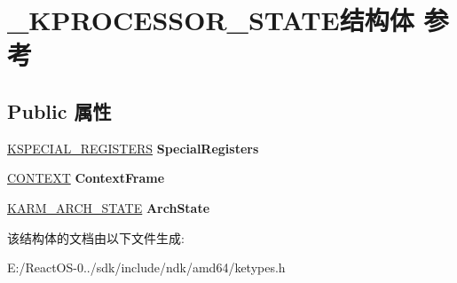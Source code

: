 \hypertarget{struct___k_p_r_o_c_e_s_s_o_r___s_t_a_t_e}{}\section{\+\_\+\+K\+P\+R\+O\+C\+E\+S\+S\+O\+R\+\_\+\+S\+T\+A\+T\+E结构体 参考}
\label{struct___k_p_r_o_c_e_s_s_o_r___s_t_a_t_e}
\subsection*{Public 属性}
\begin{DoxyCompactItemize}
\item 
\mbox{\label{struct___k_p_r_o_c_e_s_s_o_r___s_t_a_t_e_aa22101462caae96cbd41880b07e19c52}} 
\hyperlink{struct___k_s_p_e_c_i_a_l___r_e_g_i_s_t_e_r_s}{K\+S\+P\+E\+C\+I\+A\+L\+\_\+\+R\+E\+G\+I\+S\+T\+E\+RS} {\bfseries Special\+Registers}
\item 
\mbox{\label{struct___k_p_r_o_c_e_s_s_o_r___s_t_a_t_e_adbebe646e87e25ef95d4d05e7cfc8ec5}} 
\hyperlink{struct___c_o_n_t_e_x_t}{C\+O\+N\+T\+E\+XT} {\bfseries Context\+Frame}
\item 
\mbox{\label{struct___k_p_r_o_c_e_s_s_o_r___s_t_a_t_e_a940f27f434cb52c343289c0cf602c057}} 
\hyperlink{struct___k_a_r_m___a_r_c_h___s_t_a_t_e}{K\+A\+R\+M\+\_\+\+A\+R\+C\+H\+\_\+\+S\+T\+A\+TE} {\bfseries Arch\+State}
\end{DoxyCompactItemize}


该结构体的文档由以下文件生成\+:\begin{DoxyCompactItemize}
\item 
E\+:/\+React\+O\+S-\/0../sdk/include/ndk/amd64/ketypes.\+h\end{DoxyCompactItemize}
